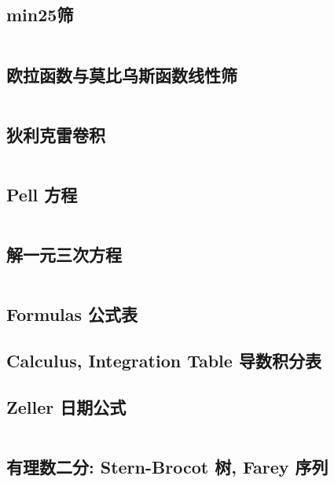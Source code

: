 				\subsection{min25筛}
					\inputminted{cpp}{sections/NumberTheory/assets/Math/min_25筛.cpp}
				\subsection{欧拉函数与莫比乌斯函数线性筛}
					\inputminted{cpp}{sections/NumberTheory/assets/Math/线性筛-积性函数.cpp}
				\subsection{狄利克雷卷积}
					\inputminted{cpp}{sections/NumberTheory/assets/Math/狄利克雷卷积.cpp}
				\subsection{Pell 方程}
					\inputminted{cpp}{sections/NumberTheory/assets/Math/Pell方程.cpp}
					\subsection{解一元三次方程}
						\inputminted{cpp}{sections/NumberTheory/assets/Math/解一元三次方程.cpp}
\begin{spacing}{0.4}
				\subsection{Formulas 公式表}
					
				\subsection{Calculus, Integration Table 导数积分表}
					
					
\end{spacing}
				\subsection{Zeller 日期公式}
					\inputminted{cpp}{sections/NumberTheory/assets/Miscellany/日期公式.cpp}
					\subsection{有理数二分: Stern-Brocot 树, Farey 序列}
						\inputminted{python}{sections/NumberTheory/assets/yzh/farey.py}

